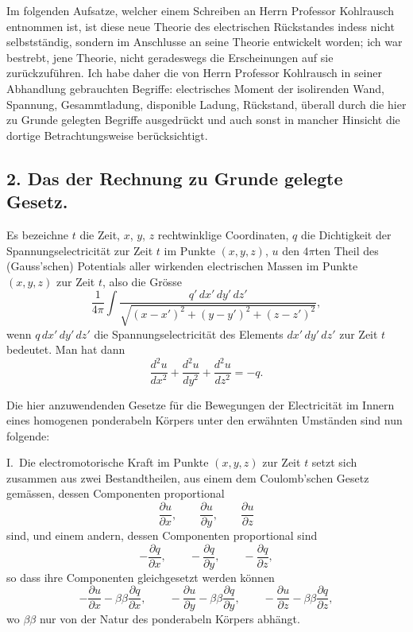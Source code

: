 \documentclass[12pt,a4paper]{article}
\begin{document}
Im folgenden Aufsatze, welcher einem Schreiben an Herrn Professor Kohlrausch entnommen ist, ist diese neue Theorie des electrischen R\"uckstandes indess nicht selbstst\"andig, sondern im Anschlusse an seine Theorie entwickelt worden; ich war bestrebt, jene Theorie, nicht geradeswegs die Erscheinungen auf sie zur\"uckzuf\"uhren. Ich habe daher die von Herrn Professor Kohlrausch in seiner Abhandlung gebrauchten Begriffe: electrisches Moment der isolirenden Wand, Spannung, Gesammtladung, disponible Ladung, R\"uckstand, \"uberall durch die hier zu Grunde gelegten Begriffe ausgedr\"uckt und auch sonst in mancher Hinsicht die dortige Betrachtungsweise ber\"ucksichtigt.

\subsection*{2. Das der Rechnung zu Grunde gelegte Gesetz.}

Es bezeichne $t$ die Zeit, $x$, $y$, $z$ rechtwinklige Coordinaten, $q$ die Dichtigkeit der Spannungselectricit\"at zur Zeit $t$ im Punkte $(x,y,z)$, $u$ den $4\pi$ten Theil des (Gauss'schen) Potentials aller wirkenden electrischen Massen im Punkte $(x,y,z)$ zur Zeit $t$, also die Gr\"osse
\[
\frac{1}{4\pi} \int \frac{q'\,dx'\,dy'\,dz'}{\sqrt{(x-x')^2 + (y-y')^2 + (z-z')^2}},
\]
wenn $q\,dx'\,dy'\,dz'$ die Spannungselectricit\"at des Elements $dx'\,dy'\,dz'$ zur Zeit $t$ bedeutet. Man hat dann
\[
\frac{d^2u}{dx^2} + \frac{d^2u}{dy^2} + \frac{d^2u}{dz^2} = -q.
\]

Die hier anzuwendenden Gesetze f\"ur die Bewegungen der Electricit\"at im Innern eines homogenen ponderabeln K\"orpers unter den erw\"ahnten Umst\"anden sind nun folgende:

I.\ Die electromotorische Kraft im Punkte $(x,y,z)$ zur Zeit $t$ setzt sich zusammen aus zwei Bestandtheilen, aus einem dem Coulomb'schen Gesetz gem\"assen, dessen Componenten proportional
\[
\frac{\partial u}{\partial x}, \qquad \frac{\partial u}{\partial y}, \qquad \frac{\partial u}{\partial z}
\]
sind, und einem andern, dessen Componenten proportional sind
\[
-\frac{\partial q}{\partial x}, \qquad -\frac{\partial q}{\partial y}, \qquad -\frac{\partial q}{\partial z},
\]
so dass ihre Componenten gleichgesetzt werden k\"onnen
\[
-\frac{\partial u}{\partial x} - \beta\beta\frac{\partial q}{\partial x}, \qquad
-\frac{\partial u}{\partial y} - \beta\beta\frac{\partial q}{\partial y}, \qquad
-\frac{\partial u}{\partial z} - \beta\beta\frac{\partial q}{\partial z},
\]
wo $\beta\beta$ nur von der Natur des ponderabeln K\"orpers abh\"angt.
\end{document}
